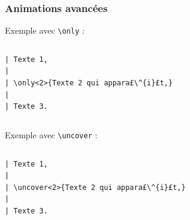 \begin{frame}[fragile]
  \frametitle{Animations avancées}

Exemple avec \lstinline?\only? :
\begin{columns}
  \begin{column}{0.40\textwidth}
\begin{lstlisting}
| Texte 1,
| 
| \only<2>{Texte 2 qui appara£\^{i}£t,}
| 
| Texte 3.
\end{lstlisting}
  \end{column}
  \begin{column}{0.37\textwidth}
  \end{column}
\end{columns}

\bigskip
Exemple avec \lstinline?\uncover? :
\begin{columns}
  \begin{column}{0.40\textwidth}
\begin{lstlisting}
| Texte 1,
| 
| \uncover<2>{Texte 2 qui appara£\^{i}£t,}
| 
| Texte 3.
\end{lstlisting}
  \end{column}
  \begin{column}{0.37\textwidth}
  \end{column}
\end{columns}

\end{frame}




